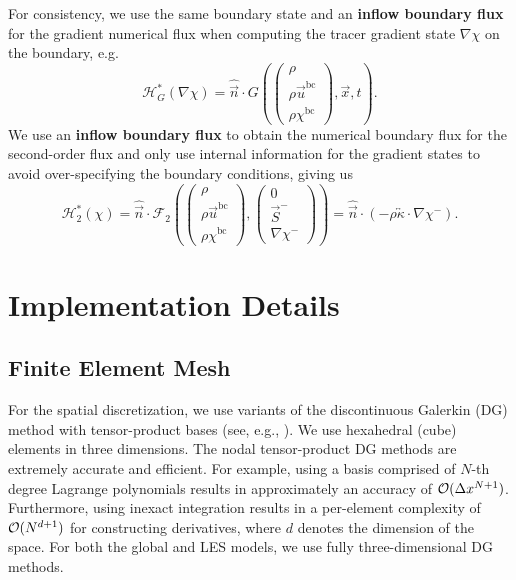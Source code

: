 \documentclass{report}
\numberwithin{equation}{section}
\begin{document}
For consistency, we use the same boundary state and an \textbf{inflow boundary flux} for the gradient numerical flux when computing the tracer gradient state $\nabla \chi$ on the boundary, e.g. 
\begin{equation}
    \mathcal{H}_G^*(\nabla \chi) = \hat{\vec n } \cdot G \left(\begin{pmatrix} \rho \\ \rho \vec u^{\text{bc}} \\ \rho \chi^{\text{bc}} \end{pmatrix}, \vec x, t \right).
\end{equation}
We use an \textbf{inflow boundary flux} to obtain the numerical boundary flux for the second-order flux and only use internal information for the gradient states to avoid over-specifying the boundary conditions, giving us
\begin{equation}
    \mathcal{H}_2^*(\chi) = \hat{\vec n } \cdot \mathcal{F}_2 \left(
        \begin{pmatrix} \rho \\ \rho \vec u^{\text{bc}} \\ \rho \chi^{\text{bc}} \end{pmatrix},
        \begin{pmatrix} 0 \\ \vec S^- \\ \nabla \chi^- \end{pmatrix}
    \right)
    = \hat{\vec n } \cdot \left( - \rho \overleftrightarrow{\kappa} \cdot \nabla \chi^- \right) .
\end{equation}

\section{Implementation Details}

\subsection{Finite Element Mesh}
For the spatial discretization, we use variants of the discontinuous Galerkin (DG) method with tensor-product bases (see, e.g., \citealt{giraldo:2008a,abdi:2016}). 
We use hexahedral (cube) elements in three dimensions.  
The nodal tensor-product DG methods are extremely accurate and efficient.  
For example, using a basis comprised of $N$-th degree Lagrange polynomials results in approximately an accuracy of $\mathcal{O}(\Delta x^{N+1})$. 
Furthermore, using inexact integration results in a per-element complexity of $\mathcal{O}(N^{d+1})$ for constructing derivatives, where $d$ denotes the dimension of the space. 
For both the global and LES models, we use fully three-dimensional DG methods.
\end{document}
